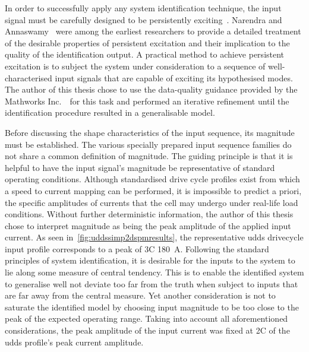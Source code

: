 In order  to successfully apply  any system identification technique,  the input
signal must be carefully  designed to be persistently exciting~\cite{Ljung1999}.
Narendra and Annaswamy~\cite{Narendra1984,Narendra1987}  were among the earliest
researchers  to provide  a detailed  treatment  of the  desirable properties  of
persistent excitation and their implication to the quality of the identification
output. A  practical method to achieve  persistent excitation is to  subject the
system under  consideration to  a sequence  of well-characterised  input signals
that  are  capable of  exciting  its  hypothesised  modes.  The author  of  this
thesis  chose  to  use  the  data-quality guidance  provided  by  the  Mathworks
Inc.~\cite{mathworkssysid}\ for this task  and performed an iterative refinement
until the identification procedure resulted in a generalisable model.

Before discussing the shape characteristics of the input sequence, its magnitude
must be established.  The various specially prepared input  sequence families do
not share a common definition of magnitude.  The guiding principle is that it is
helpful  to have  the input  signal's  magnitude be  representative of  standard
operating  conditions. Although  standardised  drive cycle  profiles exist  from
which a speed to current mapping can be performed, it is impossible to predict a
priori, the  specific amplitudes  of currents  that the  cell may  undergo under
real-life load conditions. Without further deterministic information, the author
of  this thesis  chose to  interpret magnitude  as being  the peak  amplitude of
the  applied  input  current. As  seen  in~\cref{fig:uddssimp2dspmresults},  the
representative  \gls{udds}  drivecycle  input  profile  corresponds  to  a  peak
of  3C \ie{}  \SI{180}{\ampere}.  Following the  standard  principles of  system
identification, it is desirable  for the inputs to the system  to lie along some
measure  of  central tendency.  This  is  to  enable  the identified  system  to
generalise well \ie{} not deviate too far  from the truth when subject to inputs
that are far away from the central  measure. Yet another consideration is not to
saturate the identified model by choosing input magnitude to be too close to the
peak of  the expected  operating range. Taking  into account  all aforementioned
considerations, the  peak amplitude of the  input current was fixed  at 2C \ie{}
 of the \gls{udds} profile's peak current amplitude.


